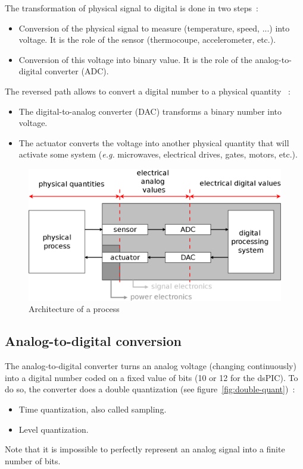 \documentclass[11pt,a4paper]{article}
\theoremstyle{definition}%
\begin{document}
The transformation of physical signal to digital is done in two steps~:
\begin{itemize}
	\item Conversion of the physical signal to measure (temperature, speed, ...) into voltage. It is the role of the sensor (thermocoupe, accelerometer, etc.).
	\item Conversion of this voltage into binary value. It is the role of the analog-to-digital converter (ADC).
\end{itemize}

The reversed path allows to convert a digital number to a physical quantity ~:
\begin{itemize}
	\item The digital-to-analog converter (DAC) transforms a binary number into voltage.
	\item The actuator converts the voltage into another physical quantity that will activate some system (\textit{e.g.} microwaves, electrical drives, gates, motors, etc.).
\end{itemize}

\begin{figure}[H]
	\includegraphics[width=\textwidth]{ENarch-processus}
	\caption{Architecture of a process}
	\label{fig:arch-processus}
\end{figure}

\subsection{Analog-to-digital conversion}
The analog-to-digital converter turns an analog voltage (changing continuously) into a digital number coded on a fixed value of bits (10 or 12 for the dsPIC).
To do so, the converter does a double quantization (see figure~\ref{fig:double-quant})~:
\begin{itemize}
	\item Time quantization, also called sampling.
	\item Level quantization.
\end{itemize}
Note that it is impossible to perfectly represent an analog signal into a finite number of bits.
\end{document}
